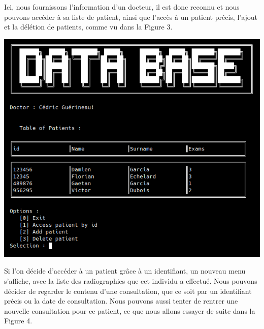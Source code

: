 \documentclass[12pt,a4paper]{article}
\newenvironment{Figure}
{\par\medskip\noindent\minipage{\linewidth}}
{\endminipage\par\medskip}
\begin{document}
\begin{multicols}{2}
		Ici, nous fournissons l'information d'un docteur, il est donc reconnu et nous pouvons accéder à sa liste de patient, ainsi que l'accès à un patient précis, l'ajout et la délétion de patients, comme vu dans la Figure 3. \\
		
		\begin{Figure}
			\centering
			\includegraphics[width=\linewidth]{images/walkthrough/doctor_main.png}
			\label{fig:doctor_menu}
		\end{Figure}
		
		Si l'on décide d'accéder à un patient grâce à un identifiant, un nouveau menu s'affiche, avec la liste des radiographies que cet individu a effectué. Nous pouvons décider de regarder le contenu d'une consultation, que ce soit par un identifiant précis ou la date de consultation. Nous pouvons aussi tenter de rentrer une nouvelle consultation pour ce patient, ce que nous allons essayer de suite dans la Figure 4. \\
		

\end{multicols}
\end{document}

